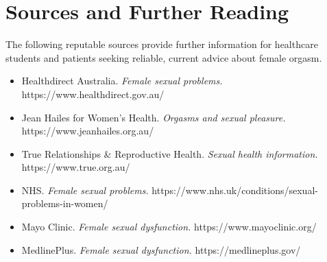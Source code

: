\section*{Sources and Further Reading}
The following reputable sources provide further information for healthcare students and patients seeking reliable, current advice about female orgasm.
\begin{itemize}
    \item Healthdirect Australia. \textit{Female sexual problems.} https://www.healthdirect.gov.au/
    \item Jean Hailes for Women's Health. \textit{Orgasms and sexual pleasure.} https://www.jeanhailes.org.au/
    \item True Relationships \& Reproductive Health. \textit{Sexual health information.} https://www.true.org.au/
    \item NHS. \textit{Female sexual problems.} https://www.nhs.uk/conditions/sexual-problems-in-women/
    \item Mayo Clinic. \textit{Female sexual dysfunction.} https://www.mayoclinic.org/
    \item MedlinePlus. \textit{Female sexual dysfunction.} https://medlineplus.gov/
\end{itemize}
